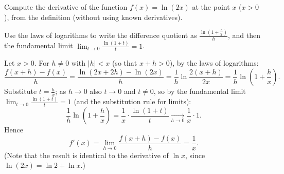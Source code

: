 
\begin{question}
Compute the derivative of the function $f(x)=\ln(2x)$ at the point $x$ ($x>0$), from the definition (without using known derivatives).
\end{question}

\begin{hint}
Use the laws of logarithms to write the difference quotient as $\frac{\ln(1+\frac hx)}{h}$, and then the fundamental limit $\lim_{t\to0}\frac{\ln(1+t)}{t}=1$.
\end{hint}

\begin{solution}
Let $x>0$. For $h\ne0$ with $|h|<x$ (so that $x+h>0$), by the laws of logarithms:
\[ \frac{f(x+h)-f(x)}{h}=\frac{\ln(2x+2h)-\ln(2x)}{h}=\frac{1}{h}\ln\frac{2(x+h)}{2x}=\frac1h\ln\left(1+\frac hx\right). \]
Substitute $t=\frac hx$; as $h\to0$ also $t\to0$ and $t\ne0$, so by the fundamental limit $\lim_{t\to0}\frac{\ln(1+t)}{t}=1$ (and the substitution rule for limits):
\[ \frac1h\ln\left(1+\frac hx\right)=\frac1x\cdot\frac{\ln(1+t)}{t}\xrightarrow[h\to0]{}\frac1x\cdot1. \]
Hence
\[ \boxed{f'(x)=\lim_{h\to0}\frac{f(x+h)-f(x)}{h}=\frac1x}. \]
(Note that the result is identical to the derivative of $\ln x$, since $\ln(2x)=\ln2+\ln x$.)
\end{solution}
